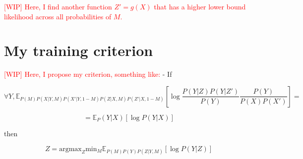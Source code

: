 \documentclass[a4paper,12pt]{article}
\newcommand{\crit}[1]{\textcolor{red}{#1}}
\begin{document}
\crit{[WIP] Here, I find another function $Z' = g(X)$ that has a higher lower bound likelihood across all probabilities of $M$.}

\section{My training criterion}

\crit{[WIP] Here, I propose my criterion, something like:}
-
If

$$\forall Y, \mathbb{E}_{P(M) P(X|Y,M) P(X'|Y, 1-M) P(Z|X, M) P(Z'|X, 1-M)} \left[\log \frac{P(Y | Z) P(Y|Z')}{P(Y)} \frac{P(Y)}{P(X) P(X')}\right] =$$

$$= \mathbb{E}_P(Y|X) [\log P(Y|X)]$$

then 

$$Z = \textrm{argmax}_Z \textrm{min}_M \mathbb{E}_{P(M) P(Y) P(Z | Y, M)} [\log P(Y | Z)]$$


%

\cleardoublepage
{}
{}
% 
\printbibliography



\end{document}
